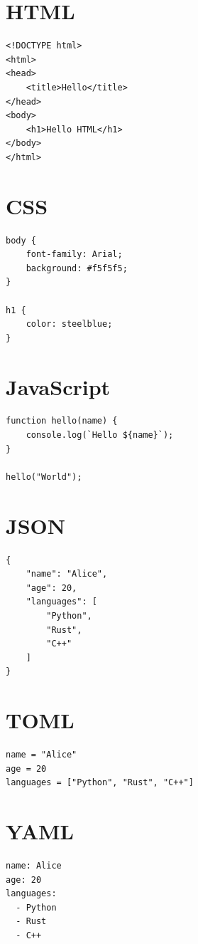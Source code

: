 \documentclass[a4paper,12pt]{article}   %
\begin{document}
\section{HTML}

\begin{verbatim}
<!DOCTYPE html>
<html>
<head>
    <title>Hello</title>
</head>
<body>
    <h1>Hello HTML</h1>
</body>
</html>
\end{verbatim}

\section{CSS}

\begin{verbatim}
body {
    font-family: Arial;
    background: #f5f5f5;
}

h1 {
    color: steelblue;
}
\end{verbatim}

\section{JavaScript}

\begin{verbatim}
function hello(name) {
    console.log(`Hello ${name}`);
}

hello("World");
\end{verbatim}

\section{JSON}

\begin{verbatim}
{
    "name": "Alice",
    "age": 20,
    "languages": [
        "Python",
        "Rust",
        "C++"
    ]
}
\end{verbatim}

\section{TOML}

\begin{verbatim}
name = "Alice"
age = 20
languages = ["Python", "Rust", "C++"]
\end{verbatim}

\section{YAML}

\begin{verbatim}
name: Alice
age: 20
languages:
  - Python
  - Rust
  - C++
\end{verbatim}
\end{document}

